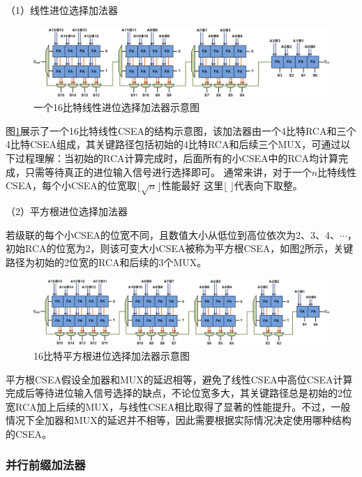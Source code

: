 （1）线性进位选择加法器

\begin{figure}[!htb]
    \centering
    \includegraphics[width=\textwidth]{figs/EM-CSEA_linear.png}
    \caption{一个16比特线性进位选择加法器示意图}
\label{EM:Fig:CSEA_linear}
\end{figure}

图\ref{EM:Fig:CSEA_linear}展示了一个16比特线性CSEA的结构示意图，该加法器由一个4比特RCA和三个4比特CSEA组成，其关键路径包括初始的4比特RCA和后续三个MUX，可通过以下过程理解：当初始的RCA计算完成时，后面所有的小CSEA中的RCA均计算完成，只需等待真正的进位输入信号进行选择即可。
通常来讲，对于一个$n$比特线性CSEA，每个小CSEA的位宽取$\lfloor \sqrt n \rfloor$性能最好%
这里$\lfloor \ \rfloor$代表向下取整。

（2）平方根进位选择加法器

若级联的每个小CSEA的位宽不同，且数值大小从低位到高位依次为$2$、$3$、$4$、$\cdots$，初始RCA的位宽为2，则该可变大小CSEA被称为平方根CSEA，如图\ref{EM:Fig:CSEA_square}所示，关键路径为初始的2位宽的RCA和后续的3个MUX。
\begin{figure}[!htb]
    \centering
    \includegraphics[width=\textwidth]{figs/EM-CSEA_square.png}
    \caption{16比特平方根进位选择加法器示意图}
\label{EM:Fig:CSEA_square}
\end{figure}
平方根CSEA假设全加器和MUX的延迟相等，避免了线性CSEA中高位CSEA计算完成后等待进位输入信号选择的缺点，不论位宽多大，其关键路径总是初始的2位宽RCA加上后续的MUX，与线性CSEA相比取得了显著的性能提升。不过，一般情况下全加器和MUX的延迟并不相等，因此需要根据实际情况决定使用哪种结构的CSEA。

\subsubsection{并行前缀加法器\cite{EM:book_Computer_Arithmetic}}

